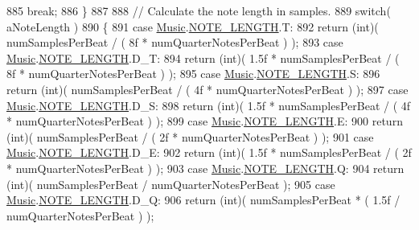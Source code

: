 \begin{DoxyCodeInclude}
885                 \textcolor{keywordflow}{break};
886         \}
887 
888         \textcolor{comment}{// Calculate the note length in samples.}
889         \textcolor{keywordflow}{switch}( aNoteLength )
890         \{
891             \textcolor{keywordflow}{case} \hyperlink{class_music}{Music}.\hyperlink{group___music_enums_gaf11b5f079adbb21c800b9eca1c5c3cbd}{NOTE\_LENGTH}.T:
892                 \textcolor{keywordflow}{return} (\textcolor{keywordtype}{int})( numSamplesPerBeat / ( 8f * numQuarterNotesPerBeat ) );
893             \textcolor{keywordflow}{case} \hyperlink{class_music}{Music}.\hyperlink{group___music_enums_gaf11b5f079adbb21c800b9eca1c5c3cbd}{NOTE\_LENGTH}.D\_T:
894                 \textcolor{keywordflow}{return} (\textcolor{keywordtype}{int})( 1.5f * numSamplesPerBeat / ( 8f * numQuarterNotesPerBeat ) );
895             \textcolor{keywordflow}{case} \hyperlink{class_music}{Music}.\hyperlink{group___music_enums_gaf11b5f079adbb21c800b9eca1c5c3cbd}{NOTE\_LENGTH}.S:
896                 \textcolor{keywordflow}{return} (\textcolor{keywordtype}{int})( numSamplesPerBeat / ( 4f * numQuarterNotesPerBeat ) );
897             \textcolor{keywordflow}{case} \hyperlink{class_music}{Music}.\hyperlink{group___music_enums_gaf11b5f079adbb21c800b9eca1c5c3cbd}{NOTE\_LENGTH}.D\_S:
898                 \textcolor{keywordflow}{return} (\textcolor{keywordtype}{int})( 1.5f * numSamplesPerBeat / ( 4f * numQuarterNotesPerBeat ) );
899             \textcolor{keywordflow}{case} \hyperlink{class_music}{Music}.\hyperlink{group___music_enums_gaf11b5f079adbb21c800b9eca1c5c3cbd}{NOTE\_LENGTH}.E:
900                 \textcolor{keywordflow}{return} (\textcolor{keywordtype}{int})( numSamplesPerBeat / ( 2f * numQuarterNotesPerBeat ) );
901             \textcolor{keywordflow}{case} \hyperlink{class_music}{Music}.\hyperlink{group___music_enums_gaf11b5f079adbb21c800b9eca1c5c3cbd}{NOTE\_LENGTH}.D\_E:
902                 \textcolor{keywordflow}{return} (\textcolor{keywordtype}{int})( 1.5f * numSamplesPerBeat / ( 2f * numQuarterNotesPerBeat ) );
903             \textcolor{keywordflow}{case} \hyperlink{class_music}{Music}.\hyperlink{group___music_enums_gaf11b5f079adbb21c800b9eca1c5c3cbd}{NOTE\_LENGTH}.Q:
904                 \textcolor{keywordflow}{return} (\textcolor{keywordtype}{int})( numSamplesPerBeat / numQuarterNotesPerBeat );
905             \textcolor{keywordflow}{case} \hyperlink{class_music}{Music}.\hyperlink{group___music_enums_gaf11b5f079adbb21c800b9eca1c5c3cbd}{NOTE\_LENGTH}.D\_Q:
906                 \textcolor{keywordflow}{return} (\textcolor{keywordtype}{int})( numSamplesPerBeat * ( 1.5f / numQuarterNotesPerBeat ) );

\end{DoxyCodeInclude}
